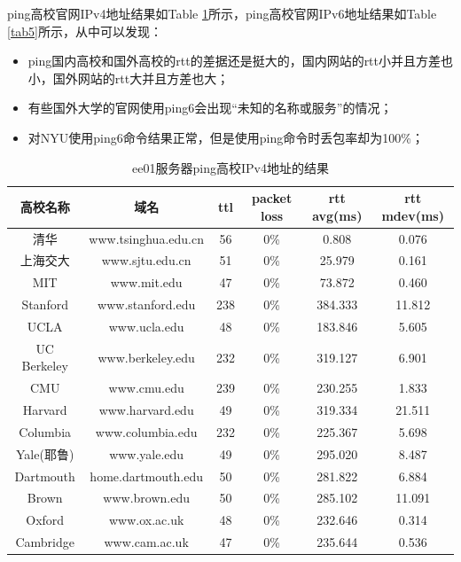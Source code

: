 \documentclass[12pt,letterpaper]{article}
\begin{document}
ping高校官网IPv4地址结果如Table \ref{tab4}所示，ping高校官网IPv6地址结果如Table \ref{tab5}所示，从中可以发现：
\begin{itemize}
	\item ping国内高校和国外高校的rtt的差据还是挺大的，国内网站的rtt小并且方差也小，国外网站的rtt大并且方差也大；
	\item 有些国外大学的官网使用ping6会出现“未知的名称或服务”的情况；
	\item 对NYU使用ping6命令结果正常，但是使用ping命令时丢包率却为100\%；
\end{itemize}
\begin{table}[!h]
	\centering
	\caption{\label{tab4}ee01服务器ping高校IPv4地址的结果}
	\begin{tabular}{|c|c|c|c|c|c|}
		\hline
		高校名称 & 域名 & ttl & packet loss & rtt avg(ms) & rtt mdev(ms) \\
		\hline
		清华 & www.tsinghua.edu.cn & 56 & 0\%& 0.808 & 0.076 \\
		\hline
		上海交大 & www.sjtu.edu.cn & 51 & 0\%& 25.979 & 0.161 \\
		\hline
		MIT & www.mit.edu & 47 & 0\% & 73.872 & 0.460 \\
		\hline
		Stanford & www.stanford.edu & 238 & 0\% & 384.333 & 11.812 \\
		\hline
		UCLA & www.ucla.edu & 48 & 0\% & 183.846 & 5.605\\
		\hline
		UC Berkeley & www.berkeley.edu & 232 & 0\% & 319.127 & 6.901 \\
		\hline
		CMU & www.cmu.edu & 239 & 0\% & 230.255 & 1.833 \\
		\hline
		Harvard & www.harvard.edu & 49 & 0\% & 319.334 & 21.511 \\
		\hline
		Columbia & www.columbia.edu & 232 & 0\% & 225.367 & 5.698 \\
		\hline
		Yale(耶鲁) & www.yale.edu & 49 & 0\% & 295.020 & 8.487 \\
		\hline
		Dartmouth & home.dartmouth.edu & 50 & 0\% & 281.822 & 6.884 \\
		\hline
		Brown & www.brown.edu & 50 & 0\% & 285.102 & 11.091 \\
		\hline
		Oxford & www.ox.ac.uk & 48 & 0\% & 232.646 & 0.314 \\
		\hline
		Cambridge & www.cam.ac.uk & 47 & 0\% & 235.644 & 0.536 \\
		\hline
	\end{tabular}
\end{table}
\end{document}
